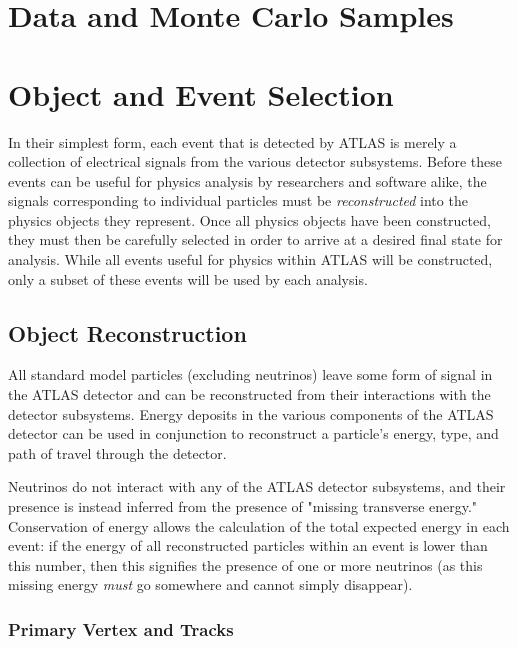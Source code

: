 \documentclass[12pt,a4paper,epsf,portrait,times,epsfig]{report}
\begin{document}

		\newpage

		\chapter{Data and Monte Carlo Samples}

		\chapter{Object and Event Selection}

		In their simplest form, each event that is detected by ATLAS is merely a collection of electrical signals from the various detector subsystems. Before these events can be useful for physics analysis by researchers and software alike, the signals corresponding to individual particles must be \textit{reconstructed} into the physics objects they represent. Once all physics objects have been constructed, they must then be carefully selected in order to arrive at a desired final state for analysis. While all events useful for physics within ATLAS will be constructed, only a subset of these events will be used by each analysis.  

		\section{Object Reconstruction}

		All standard model particles (excluding neutrinos) leave some form of signal in the ATLAS detector and can be reconstructed from their interactions with the detector subsystems. Energy deposits in the various components of the ATLAS detector can be used in conjunction to reconstruct a particle's energy, type, and path of travel through the detector. \par
		
		Neutrinos do not interact with any of the ATLAS detector subsystems, and their presence is instead inferred from the presence of "missing transverse energy." Conservation of energy allows the calculation of the total expected energy in each event: if the energy of all reconstructed particles within an event is lower than this number, then this signifies the presence of one or more neutrinos (as this missing energy \textit{must} go somewhere and cannot simply disappear). \par

		\subsection{Primary Vertex and Tracks}
\end{document}
